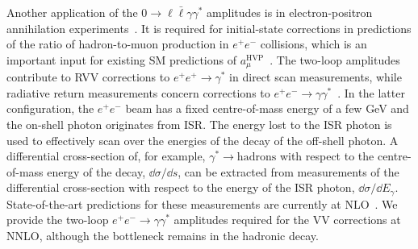 \documentclass[main.tex]{subfiles}
\begin{document}
Another application of the $0\to \ell \bar\ell \gamma \gamma^*$ amplitudes is in electron-positron annihilation experiments~\cite{precisionsm}.
It is required for initial-state corrections in predictions of the ratio of hadron-to-muon production in $e^+e^-$ collisions, which is an important input for existing SM predictions of $a^{\text{HVP}}_\mu$~\cite{Abbiendi:2022liz}.
The two-loop amplitudes contribute to \ac{RVV} corrections to $e^+e^+\to\gamma^*$ in direct scan measurements, while radiative return measurements concern corrections to $e^+e^-\to\gamma\gamma^*$~\cite{Aoyama:2020ynm}.
In the latter configuration, the $e^+e^-$ beam has a fixed centre-of-mass energy of a few GeV and the on-shell photon originates from \ac{ISR}.
The energy lost to the \ac{ISR} photon is used to effectively scan over the energies of the decay of the off-shell photon.
A differential cross-section of, for example, $\gamma^*\to\text{hadrons}$ with respect to the centre-of-mass energy of the decay, $\dd\sigma/\dd s$, can be extracted from measurements of the differential cross-section with respect to the energy of the \ac{ISR} photon, $\dd\sigma/\dd E_\gamma$.
State-of-the-art predictions for these measurements are currently at NLO~\cite{Abbiendi:2022liz}.
We provide the two-loop $e^+e^-\to\gamma\gamma^*$ amplitudes required for the \ac{VV} corrections at NNLO, although the bottleneck remains in the hadronic decay.
\end{document}
